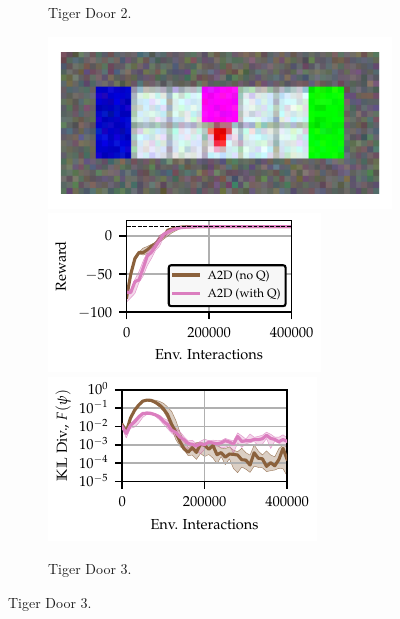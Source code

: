\begin{figure}[t]
\begin{subfigure}[t]{0.3\textwidth}
        \caption{Tiger Door 2.}
        \label{supp:fig:grid:OSC:td2}
    \end{subfigure}%
    \hfill%
    \begin{subfigure}[t]{0.3\textwidth}
        \includegraphics[width=\textwidth]{figures/OSC/TD3.pdf}
        \includegraphics[width=\textwidth]{figures/OSC/cr_osc_6/OSC_TD3_lam05_reward_TigerDoor_True_v3_cr_osc_6_q0_2021_06_07__18_05_38_.pdf}
        \includegraphics[width=\textwidth]{figures/OSC/cr_osc_6/OSC_TD3_lam05_divergence_TigerDoor_True_v3_cr_osc_6_q0_2021_06_07__18_05_38_.pdf}
        \caption{Tiger Door 3.}
        \label{supp:fig:grid:OSC:td3}
    \end{subfigure}%


\end{figure}
